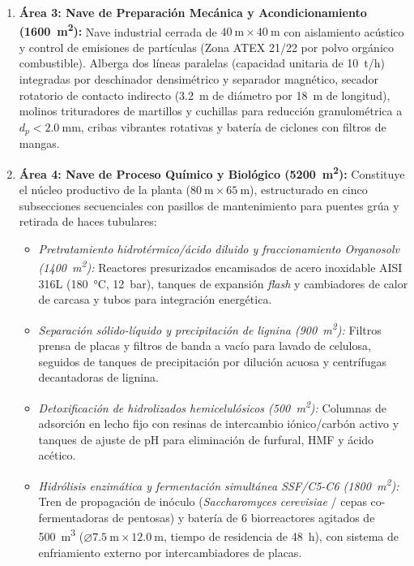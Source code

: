 \documentclass{report}
\begin{document}
\begin{enumerate}
\begin{itemize}
          \end{itemize}
    \item \textbf{Área 3: Nave de Preparación Mecánica y Acondicionamiento (\SI{1600}{\square\metre}):} Nave industrial cerrada de $\SI{40}{\metre} \times \SI{40}{\metre}$ con aislamiento acústico y control de emisiones de partículas (Zona ATEX 21/22 por polvo orgánico combustible). Alberga dos líneas paralelas (capacidad unitaria de \SI{10}{\tonne/h}) integradas por deschinador densimétrico y separador magnético, secador rotatorio de contacto indirecto (\SI{3.2}{\metre} de diámetro por \SI{18}{\metre} de longitud), molinos trituradores de martillos y cuchillas para reducción granulométrica a $d_p < \SI{2.0}{\milli\metre}$, cribas vibrantes rotativas y batería de ciclones con filtros de mangas.
    \item \textbf{Área 4: Nave de Proceso Químico y Biológico (\SI{5200}{\square\metre}):} Constituye el núcleo productivo de la planta ($\SI{80}{\metre} \times \SI{65}{\metre}$), estructurado en cinco subsecciones secuenciales con pasillos de mantenimiento para puentes grúa y retirada de haces tubulares:
          \begin{itemize}
              \item \textit{Pretratamiento hidrotérmico/ácido diluido y fraccionamiento Organosolv (\SI{1400}{\square\metre}):} Reactores presurizados encamisados de acero inoxidable AISI 316L (\SI{180}{\degreeCelsius}, \SI{12}{bar}), tanques de expansión \textit{flash} y cambiadores de calor de carcasa y tubos para integración energética.
              \item \textit{Separación sólido-líquido y precipitación de lignina (\SI{900}{\square\metre}):} Filtros prensa de placas y filtros de banda a vacío para lavado de celulosa, seguidos de tanques de precipitación por dilución acuosa y centrífugas decantadoras de lignina.
              \item \textit{Detoxificación de hidrolizados hemicelulósicos (\SI{500}{\square\metre}):} Columnas de adsorción en lecho fijo con resinas de intercambio iónico/carbón activo y tanques de ajuste de pH para eliminación de furfural, HMF y ácido acético.
              \item \textit{Hidrólisis enzimática y fermentación simultánea SSF/C5-C6 (\SI{1800}{\square\metre}):} Tren de propagación de inóculo (\textit{Saccharomyces cerevisiae} / cepas co-fermentadoras de pentosas) y batería de \num{6} biorreactores agitados de \SI{500}{\cubic\metre} ($\varnothing \SI{7.5}{\metre} \times \SI{12.0}{\metre}$, tiempo de residencia de \SI{48}{h}), con sistema de enfriamiento externo por intercambiadores de placas.

\end{itemize}
\end{enumerate}
\end{document}

